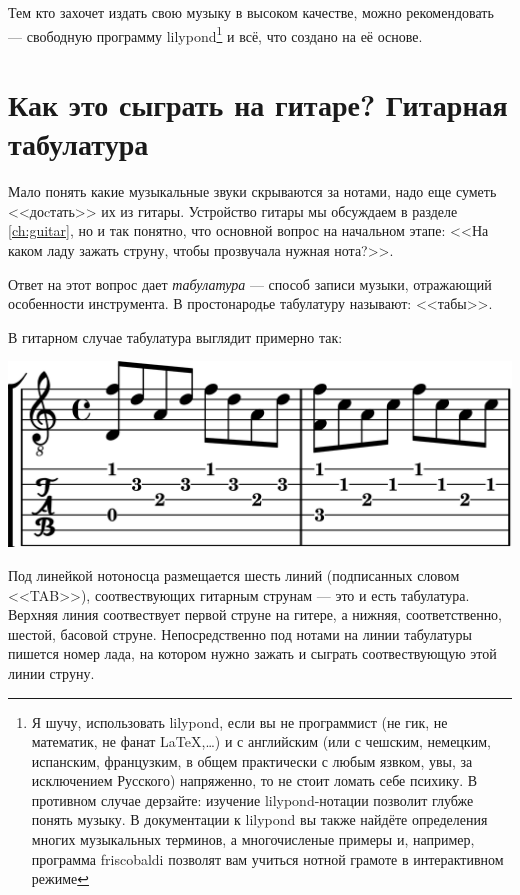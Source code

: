 Тем кто захочет издать свою музыку в высоком качестве, можно рекомендовать \cite{url:lilypond} --- свободную программу lilypond\footnote{Я шучу, использовать lilypond, если вы не программист (не гик, не математик, не фанат \LaTeX,\ldots) и с английским (или с чешским, немецким, испанским, французким, в общем практически с любым язвком, увы, за исключением Русского) напряженно, то не стоит ломать себе психику. В противном случае дерзайте: изучение lilypond-нотации позволит глубже понять музыку. В документации к lilypond вы также найдёте определения многих музыкальных терминов, а многочисленые примеры и, например, программа friscobaldi позволят вам учиться нотной грамоте в интерактивном режиме} и всё, что создано на её основе.


\section{Как это сыграть на гитаре? Гитарная табулатура}

Мало понять какие музыкальные звуки скрываются за нотами, надо еще суметь <<доcтать>> их из гитары. Устройство гитары мы обсуждаем в разделе \ref{ch:guitar}, но и так понятно, что основной вопрос на начальном этапе: <<На каком ладу зажать струну, чтобы прозвучала нужная нота?>>. 

Ответ на этот вопрос дает \emph{табулатура} --- способ записи музыки, отражающий особенности инструмента. В простонародье табулатуру называют: <<табы>>.

В гитарном случае табулатура выглядит примерно так:
\begin{center}
    \includegraphics{fig/notes/tab}
\end{center}

Под линейкой нотоносца размещается шесть линий (подписанных словом <<TAB>>), соотвествующих гитарным струнам --- это и есть табулатура. Верхняя линия соотвествует первой струне на гитере, а нижняя, соответственно, шестой, басовой струне. Непосредственно под нотами на линии табулатуры пишется номер лада, на котором нужно зажать и сыграть соотвествующую этой линии струну.

